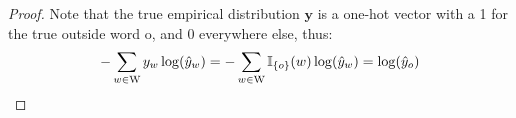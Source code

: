 \begin{proof}
  Note that the true empirical distribution $\bm{y}$ is a one-hot vector with a 1 for the true outside word o, and 0 everywhere else, thus:
  \begin{equation*}
    -\sum\limits_{w \in \text{W}} y_w \log(\hat{y}_w) = -\sum\limits_{w \in \text{W}} \I{o}(w) \log(\hat{y}_w) = \log(\hat{y}_o)
  \end{equation*}
\end{proof}